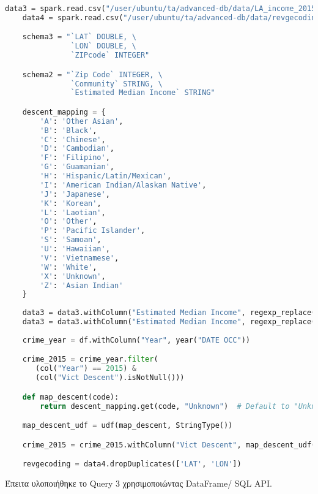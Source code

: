 \documentclass{article}
\begin{document}
\begin{lstlisting}[language = Python]
    data3 = spark.read.csv("/user/ubuntu/ta/advanced-db/data/LA_income_2015.csv", header=True, schema=schema2)
    data4 = spark.read.csv("/user/ubuntu/ta/advanced-db/data/revgecoding.csv", header=True, schema=schema3)

    schema3 = "`LAT` DOUBLE, \
               `LON` DOUBLE, \
               `ZIPcode` INTEGER"

    schema2 = "`Zip Code` INTEGER, \
	           `Community` STRING, \
	           `Estimated Median Income` STRING"

    descent_mapping = {
        'A': 'Other Asian',
        'B': 'Black',
        'C': 'Chinese',
        'D': 'Cambodian',
        'F': 'Filipino',
        'G': 'Guamanian',
        'H': 'Hispanic/Latin/Mexican',
        'I': 'American Indian/Alaskan Native',
        'J': 'Japanese',
        'K': 'Korean',
        'L': 'Laotian',
        'O': 'Other',
        'P': 'Pacific Islander',
        'S': 'Samoan',
        'U': 'Hawaiian',
        'V': 'Vietnamese',
        'W': 'White',
        'X': 'Unknown',
        'Z': 'Asian Indian'
    }
    
    data3 = data3.withColumn("Estimated Median Income", regexp_replace(col("Estimated Median Income"), "\$", ""))
    data3 = data3.withColumn("Estimated Median Income", regexp_replace(col("Estimated Median Income"), ",", "").cast("float"))
     
    crime_year = df.withColumn("Year", year("DATE OCC"))

    crime_2015 = crime_year.filter(
       (col("Year") == 2015) & 
       (col("Vict Descent").isNotNull()))

    def map_descent(code):
        return descent_mapping.get(code, "Unknown")  # Default to "Unknown" if code not found

    map_descent_udf = udf(map_descent, StringType())

    crime_2015 = crime_2015.withColumn("Vict Descent", map_descent_udf(crime_2015["Vict Descent"]))

    revgecoding = data4.dropDuplicates(['LAT', 'LON'])
\end{lstlisting}

\vspace{2\baselineskip}

Έπειτα υλοποιήθηκε το Query 3 χρησιμοποιώντας DataFrame/ SQL API. 
\end{document}
